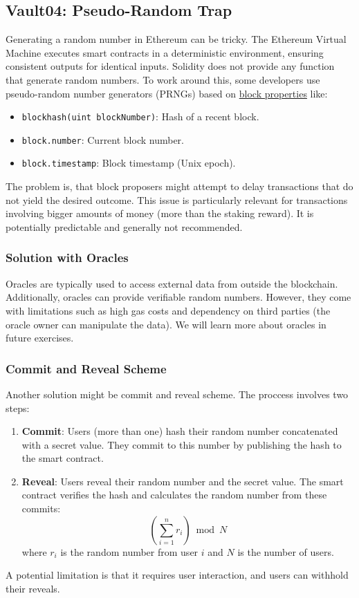 \documentclass[12pt]{article}
\begin{document}
\subsection*{Vault04: Pseudo-Random Trap}

Generating a random number in Ethereum can be tricky. The Ethereum Virtual Machine executes smart contracts in a deterministic environment, ensuring consistent outputs for identical inputs. Solidity does not provide any function that generate random numbers. To work around this, some developers use pseudo-random number generators (PRNGs) based on \href{https://docs.soliditylang.org/en/latest/cheatsheet.html\#block-and-transaction-properties}{block properties} like:

\begin{itemize}
    \item \texttt{blockhash(uint blockNumber)}: Hash of a recent block.
    \item \texttt{block.number}: Current block number.
    \item \texttt{block.timestamp}: Block timestamp (Unix epoch).
\end{itemize}

\noindent
The problem is, that block proposers might attempt to delay transactions that do not yield the desired outcome. This issue is particularly relevant for transactions involving bigger amounts of money (more than the staking reward). It is potentially predictable and generally not recommended.

\subsubsection*{Solution with Oracles} Oracles are typically used to access external data from outside the blockchain. Additionally, oracles can provide verifiable random numbers. However, they come with limitations such as high gas costs and dependency on third parties (the oracle owner can manipulate the data). We will learn more about oracles in future exercises.

\subsubsection*{Commit and Reveal Scheme} Another solution might be commit and reveal scheme. The proccess involves two steps:
\begin{enumerate}
    \item \textbf{Commit}: Users (more than one) hash their random number concatenated with a secret value. They commit to this number by publishing the hash to the smart contract.
    \item \textbf{Reveal}: Users reveal their random number and the secret value. The smart contract verifies the hash and calculates the random number from these commits:
    \[
    \left( \sum_{i=1}^{n} r_i \right) \bmod N
    \]
    where $r_i$ is the random number from user $i$ and $N$ is the number of users.
\end{enumerate}
\noindent
A potential limitation is that it requires user interaction, and users can withhold their reveals.
\end{document}
